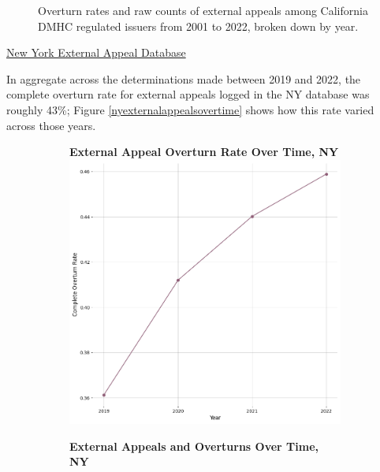 \documentclass[12pt, a4paper,twoside]{report}
\theoremstyle{plain} %
\theoremstyle{definition} %
\theoremstyle{remark} %
\numberwithin{equation}{chapter}
\begin{document}
\begin{figure}[h!]
\begin{subfigure}[b]{0.49\textwidth}
			\end{subfigure}
			\caption{Overturn rates and raw counts of external appeals among California DMHC regulated issuers from 2001 to 2022, broken down by year.}
			\label{cadmhcexternalappealsovertime}
		\end{figure}
	
	
		\underline{New York External Appeal Database}

		In aggregate across the determinations made between 2019 and 2022, the complete overturn rate for external appeals logged in the NY database was roughly 43\%; Figure \ref{nyexternalappealsovertime} shows how this rate varied across those years.
		
		
		\begin{figure}[h!]
			\centering
			\begin{subfigure}[b]{0.49\textwidth}
				\centering
				\textbf{External Appeal Overturn Rate Over Time, NY}
				\includegraphics[width=\textwidth]{images/nys_external/external_appeal_overturn_rates_by_year.png}
			\end{subfigure}
			\hfill
			\begin{subfigure}[b]{0.49\textwidth}
				\centering
				\textbf{External Appeals and Overturns Over Time, NY}

\end{subfigure}
\end{figure}
\end{document}

